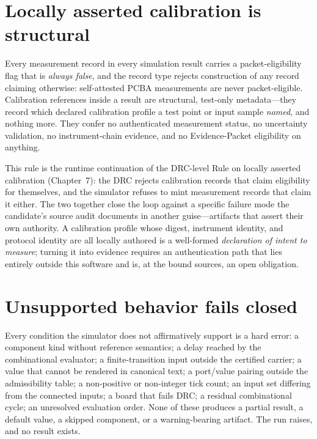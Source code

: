 \section{Locally asserted calibration is structural}\label{ch08:sec:calibration}

\begin{ruleenv}\label{ch08:rule:eligibility}
Every measurement record in every simulation result carries a packet-eligibility flag that is \emph{always false}, and the record type rejects construction of any record claiming otherwise: self-attested PCBA measurements are never packet-eligible. Calibration references inside a result are structural, test-only metadata---they record which declared calibration profile a test point or input sample \emph{named}, and nothing more. They confer no authenticated measurement status, no uncertainty validation, no instrument-chain evidence, and no Evidence-Packet eligibility on anything.
\end{ruleenv}

This rule is the runtime continuation of the DRC-level Rule on locally asserted calibration (Chapter~7): the DRC rejects calibration records that claim eligibility for themselves, and the simulator refuses to mint measurement records that claim it either. The two together close the loop against a specific failure mode the candidate's source audit documents in another guise---artifacts that assert their own authority. A calibration profile whose digest, instrument identity, and protocol identity are all locally authored is a well-formed \emph{declaration of intent to measure}; turning it into evidence requires an authentication path that lies entirely outside this software and is, at the bound sources, an open obligation.

\section{Unsupported behavior fails closed}\label{ch08:sec:failclosed}

\begin{ruleenv}\label{ch08:rule:failclosed}
Every condition the simulator does not affirmatively support is a hard error: a component kind without reference semantics; a delay reached by the combinational evaluator; a finite-transition input outside the certified carrier; a value that cannot be rendered in canonical text; a port/value pairing outside the admissibility table; a non-positive or non-integer tick count; an input set differing from the connected inputs; a board that fails DRC; a residual combinational cycle; an unresolved evaluation order. None of these produces a partial result, a default value, a skipped component, or a warning-bearing artifact. The run raises, and no result exists.
\end{ruleenv}


